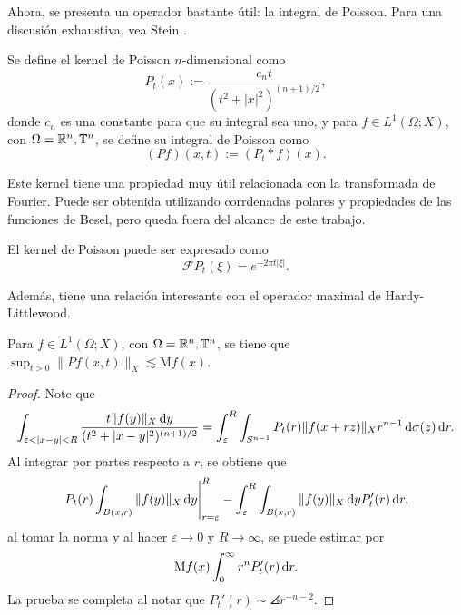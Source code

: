 Ahora, se presenta un operador bastante útil: la integral de Poisson. Para una discusión exhaustiva, vea Stein \cite{stein-singular}.
\begin{definition}
	Se define el kernel de Poisson  $n$-dimensional como 
	\begin{equation*}
		P_t(x) := \frac{c_nt}{(t^2+|x|^2)^{(n+1)/2}},
	\end{equation*}
	donde $c_n$ es una constante para que su integral sea uno, y para $f\in L^1(\Omega;X)$, con $\Omega=\mathbb{R}^n,\mathbb{T}^n$, se define su integral de Poisson como 
	\begin{equation*}
		(Pf)(x, t) := (P_t * f)(x).
	\end{equation*}
\end{definition}
Este kernel tiene una propiedad muy útil relacionada con la transformada de Fourier. Puede ser obtenida utilizando corrdenadas polares y propiedades de las funciones de Besel, pero queda fuera del alcance de este trabajo.
\begin{proposition}
	El kernel de Poisson puede ser expresado como
	\begin{equation*}
		\mathcal{F}P_t(\xi) = e^{-2\pi t|\xi|}.
	\end{equation*}
\end{proposition}
 Además, tiene una relación interesante con el operador maximal de Hardy-Littlewood.
 \begin{theorem}
 	Para $f\in L^1(\Omega;X)$, con $\Omega=\mathbb{R}^n,\mathbb{T}^n$, se tiene que $\sup_{t>0}\|Pf(x, t)\|_X \lesssim \mathrm{M}f(x)$.
 \end{theorem}
 \begin{proof}
 	Note que 
 	\begin{equation*}
 		\int_{\varepsilon<|x-y|<R} \frac{t\|f(y)\|_X\diff y}{(t^2+|x-y|^2)^{(n+1)/2}} = \int_\varepsilon^R \int_{S^{n-1}}  P_t(r)\|f(x+rz)\|_Xr^{n-1}\diff \sigma(z)\diff r.
 	\end{equation*}
 	Al integrar por partes respecto a $r$, se obtiene que 
 	\begin{equation*}
 		\left. P_t(r)\int_{B(x, r)}\|f(y)\|_X\mathop{}\!\mathrm{d} y\right\vert_{r=\varepsilon}^R - \int_\varepsilon^R \int_{B(x, r)}\|f(y)\|_X\mathop{}\!\mathrm{d} y P_t'(r) \mathop{}\!\mathrm{d} r,
 	\end{equation*} 
 	al tomar la norma y al hacer $\varepsilon\to0$ y $R\to\infty$, se puede estimar por
 	\begin{equation*}
 		\mathrm{M}f(x)\int_0^\infty r^n P_t'(r)\mathop{}\!\mathrm{d} r .
 	\end{equation*}
 	La prueba se completa al notar que $P_t'(r) \sim \angles{r}^{-n-2}$.
 \end{proof}
